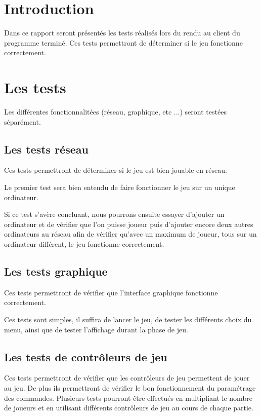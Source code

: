 \section*{Introduction}

Dans ce rapport seront présentés les tests réalisés lors du rendu au client du programme terminé. Ces tests permettront de déterminer si le jeu fonctionne correctement.

\newpage

\section{Les tests}

Les différentes fonctionnalitées (réseau, graphique, etc ...) seront testées séparément.

\subsection{Les tests réseau}

Ces tests permettront de déterminer si le jeu est bien jouable en réseau.

Le premier test sera bien entendu de faire fonctionner le jeu sur un unique ordinateur.

Si ce test s'avère concluant, nous pourrons ensuite essayer d'ajouter un ordinateur et de vérifier que l'on puisse joueur puis d'ajouter encore deux autres ordinateurs au réseau afin de vérifier qu'avec un maximum de joueur, tous sur un ordinateur différent, le jeu fonctionne correctement.

\subsection{Les tests graphique}

Ces tests permettront de vérifier que l'interface graphique fonctionne correctement.

Ces tests sont simples, il suffira de lancer le jeu, de tester les différents choix du menu, ainsi que de tester l'affichage durant la phase de jeu.

\subsection{Les tests de contrôleurs de jeu}

Ces tests permettront de vérifier que les contrôleurs de jeu permettent de jouer au jeu.
De plus ils permettront de vérifier le bon fonctionnement du paramétrage des commandes.
Plusieurs tests pourront être effectués en multipliant le nombre de joueurs et en utilisant différents contrôleurs de jeu au cours de chaque partie.

